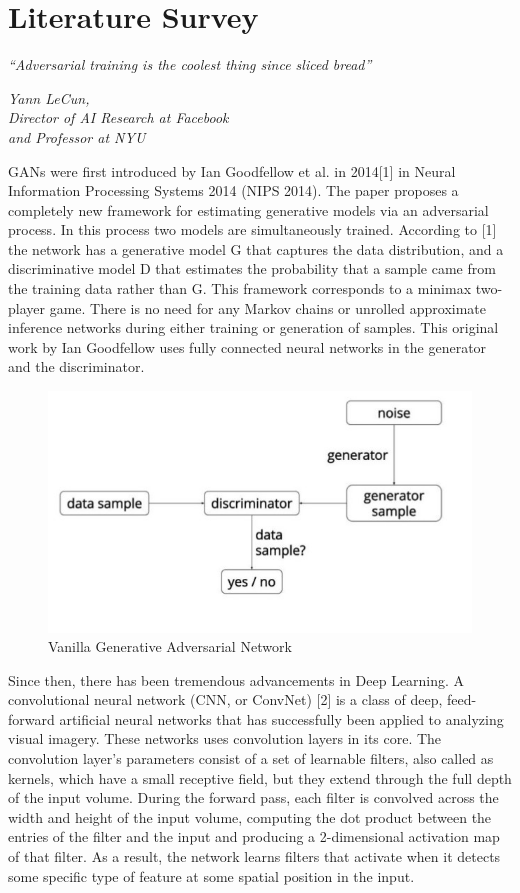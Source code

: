 \chapter{Literature Survey}\label{ch:literature_survey}
\epigraph{\textit{\Large “Adversarial training is the coolest thing since sliced bread”}}{\textit{ \large Yann LeCun,\\ Director of AI Research at Facebook \\and Professor at NYU}}
GANs were first introduced by Ian Goodfellow et al. in 2014[1] in Neural Information Processing Systems 2014 (NIPS 2014). The paper proposes a completely new framework for estimating generative models via an adversarial process. In this process two models are simultaneously trained. According to [1] the network has a generative model G that captures the data distribution, and a discriminative model D that estimates the probability that a sample came from the training data rather than G. This framework corresponds to a minimax two-player game. There is no need for any Markov chains or unrolled approximate inference networks during either training or generation of samples. This original work by Ian Goodfellow uses fully connected neural networks in the generator and the discriminator.\par\bigskip
\begin{figure}[H]
\centering\includegraphics[width=.7\textwidth]{images/vanilaGAN.jpg}
\caption{Vanilla Generative Adversarial Network}
\end{figure}
Since then, there has been tremendous advancements in Deep Learning. A convolutional neural network (CNN, or ConvNet) [2] is a class of deep, feed-forward artificial neural networks that has successfully been applied to analyzing visual imagery. These networks uses convolution layers in its core. The convolution layer's parameters consist of a set of learnable filters, also called as kernels, which have a small receptive field, but they extend through the full depth of the input volume. During the forward pass, each filter is convolved across the width and height of the input volume, computing the dot product between the entries of the filter and the input and producing a 2-dimensional activation map of that filter. As a result, the network learns filters that activate when it detects some specific type of feature at some spatial position in the input.\par\bigskip
